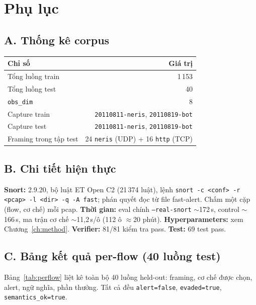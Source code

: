 \documentclass[12pt,a4paper]{report}
\begin{document}
\chapter{Phụ lục}
\label{ch:appendix}

\section{A. Thống kê corpus}
\begin{center}
\begin{tabular}{lr}
\toprule
Chỉ số & Giá trị \\
\midrule
Tổng luồng train & 1\,153 \\
Tổng luồng test  & 40 \\
\texttt{obs\_dim} & 8 \\
Capture train & \texttt{20110811-neris}, \texttt{20110819-bot} \\
Capture test  & \texttt{20110811-neris}, \texttt{20110819-bot} \\
Framing trong tập test & 24 \texttt{neris} (UDP) + 16 \texttt{http} (TCP) \\
\bottomrule
\end{tabular}
\end{center}

\section{B. Chi tiết hiện thực}
\textbf{Snort:} 2.9.20, bộ luật ET Open C2 (21\,374 luật), lệnh
\texttt{snort -c <conf> -r <pcap> -l <dir> -q -A fast}; phán quyết đọc từ file fast-alert.
Chấm một cặp (flow, cơ chế) mỗi pcap. \textbf{Thời gian:} eval chính \texttt{--real-snort}
$\sim$172\,s, control $\sim$166\,s, ma trận cơ chế $\sim$11{,}2\,s/ô (112 ô
$\approx$20 phút). \textbf{Hyperparameters:} xem Chương~\ref{ch:method}.
\textbf{Verifier:} 81/81 kiểm tra pass. \textbf{Test:} 69 test pass.

\section{C. Bảng kết quả per-flow (40 luồng test)}
Bảng~\ref{tab:perflow} liệt kê toàn bộ 40 luồng held-out: framing, cơ chế được chọn,
alert, ngữ nghĩa, phần thưởng. Tất cả đều \texttt{alert=false}, \texttt{evaded=true},
\texttt{semantics\_ok=true}.
\end{document}
